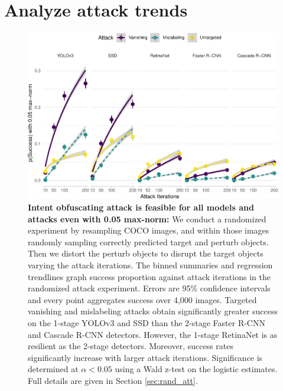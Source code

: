 \section{Analyze attack trends}\label{analyze-attack-trends}

\begin{figure}[tb]

{\centering \includegraphics[width=1\linewidth]{imgs/success_trend_graph_normed} 

}

\caption{\textbf{Intent obfuscating attack is feasible for all models and attacks even with 0.05 max-norm:}  We conduct a randomized experiment by resampling COCO images, and within those images randomly sampling correctly predicted target and perturb objects. Then we distort the perturb objects to disrupt the target objects varying the attack iterations. The binned summaries and regression trendlines graph success proportion against attack iterations in the randomized attack experiment. Errors are 95\% confidence intervals and every point aggregates success over 4,000 images. Targeted vanishing and mislabeling attacks obtain significantly greater success on the 1-stage YOLOv3 and SSD than the 2-stage Faster R-CNN and Cascade R-CNN detectors. However, the 1-stage RetinaNet is as resilient as the 2-stage detectors. Moreover, success rates significantly increase with larger attack iterations. Significance is determined at $\alpha < 0.05$ using a Wald z-test on the logistic estimates. Full details are given in Section \ref{sec:rand_att}.}\label{fig:success_trend_graph_normed}
\end{figure}

\begingroup\fontsize{9}{11}\selectfont

